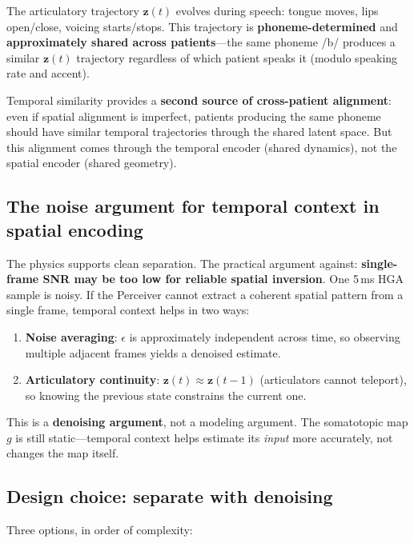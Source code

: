 \documentclass[11pt,letterpaper]{article}
\newcommand{\bfz}{\mathbf{z}}
\begin{document}
The articulatory trajectory $\bfz(t)$ evolves during speech: tongue moves, lips open/close, voicing starts/stops. This trajectory is \textbf{phoneme-determined} and \textbf{approximately shared across patients}---the same phoneme /b/ produces a similar $\bfz(t)$ trajectory regardless of which patient speaks it (modulo speaking rate and accent).

Temporal similarity provides a \textbf{second source of cross-patient alignment}: even if spatial alignment is imperfect, patients producing the same phoneme should have similar temporal trajectories through the shared latent space. But this alignment comes through the temporal encoder (shared dynamics), not the spatial encoder (shared geometry).

\subsection{The noise argument for temporal context in spatial encoding}

The physics supports clean separation. The practical argument against: \textbf{single-frame SNR may be too low for reliable spatial inversion}. One 5\,ms HGA sample is noisy. If the Perceiver cannot extract a coherent spatial pattern from a single frame, temporal context helps in two ways:
\begin{enumerate}[leftmargin=2em]
\item \textbf{Noise averaging}: $\epsilon$ is approximately independent across time, so observing multiple adjacent frames yields a denoised estimate.
\item \textbf{Articulatory continuity}: $\bfz(t) \approx \bfz(t{-}1)$ (articulators cannot teleport), so knowing the previous state constrains the current one.
\end{enumerate}
This is a \textbf{denoising argument}, not a modeling argument. The somatotopic map $g$ is still static---temporal context helps estimate its \emph{input} more accurately, not changes the map itself.

\subsection{Design choice: separate with denoising}

Three options, in order of complexity:
\end{document}
